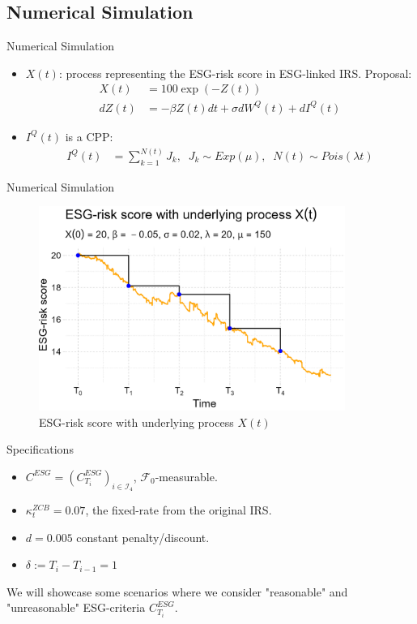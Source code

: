 \documentclass[UKenglish]{beamer}
\newcommand{\F}{\mathcal{F}} %
\begin{document}
\subsection{Numerical Simulation}
\begin{frame}{Numerical Simulation}
\begin{itemize}
    \item $X(t)$: process representing the ESG-risk score in ESG-linked IRS. Proposal: 
    \begin{align*}
    X(t) &= 100\exp(-Z(t)) \\
    dZ(t) &= -\beta Z(t)dt + \sigma dW^{Q}(t) + dI^{Q}(t)
    \end{align*}
    \item $I^{Q}(t)$ is a CPP:
    \begin{align*}
    I^{Q}(t) &= \sum_{k=1}^{N(t)}J_{k}, \;\; J_{k}\sim  Exp(\mu),\;\; N(t) \sim Pois(\lambda t)    
\end{align*} 
\end{itemize}   
\end{frame}


\begin{frame}{Numerical Simulation}
\begin{figure}[htp]
    \centering
    \includegraphics[width=10cm]{ESG/ESG_OU_path.png}
    \caption{ESG-risk score with underlying process $X(t)$}
    \label{fig: ESG_risk_score_underlying_X(t)}
\end{figure}
\end{frame}


\begin{frame}{Specifications}
\begin{itemize}
    \item $C^{ESG} = (C_{T_{i}}^{ESG})_{i\in \mathcal{I}_{4}}$, $\F_{0}$-measurable. 
    \item $\kappa_{t}^{ZCB} = 0.07$, the fixed-rate from the original IRS. 
    \item $d = 0.005$ constant penalty/discount. 
    \item $\delta:= T_{i}-T_{i-1} = 1$ 
\end{itemize}
We will showcase some scenarios where we consider "reasonable" and "unreasonable" ESG-criteria $C_{T_{i}}^{ESG}$. 

\end{frame}
\end{document}
